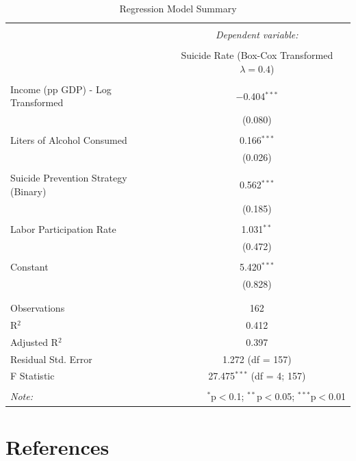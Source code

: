 \documentclass[]{article}
\begin{document}
\begin{table}[H] \centering 
  \caption {Regression Model Summary} 
  \label{tab:title} 
\begin{tabular}{@{\extracolsep{5pt}}lc} 
\\[-1.8ex]\hline 
\hline \\[-1.8ex] 
 & \multicolumn{1}{c}{\textit{Dependent variable:}} \\ 
\cline{2-2} 
\\[-1.8ex] & Suicide Rate (Box-Cox Transformed $\lambda = 0.4$) \\ 
\hline \\[-1.8ex] 
 Income (pp GDP) - Log Transformed & $-$0.404$^{***}$ \\ 
  & (0.080) \\ 
  & \\ 
Liters of Alcohol Consumed & 0.166$^{***}$ \\ 
  & (0.026) \\ 
  & \\ 
Suicide Prevention Strategy (Binary) & 0.562$^{***}$ \\ 
  & (0.185) \\ 
  & \\ 
Labor Participation Rate & 1.031$^{**}$ \\ 
  & (0.472) \\ 
  & \\ 
 Constant & 5.420$^{***}$ \\ 
  & (0.828) \\ 
  & \\ 
\hline \\[-1.8ex] 
Observations & 162 \\ 
R$^{2}$ & 0.412 \\ 
Adjusted R$^{2}$ & 0.397 \\ 
Residual Std. Error & 1.272 (df = 157) \\ 
F Statistic & 27.475$^{***}$ (df = 4; 157) \\ 
\hline 
\hline \\[-1.8ex] 
\textit{Note:}  & \multicolumn{1}{r}{$^{*}$p$<$0.1; $^{**}$p$<$0.05; $^{***}$p$<$0.01} \\ 
\end{tabular} 
\end{table}

\newpage 

\section{References}\label{references}
\end{document}
